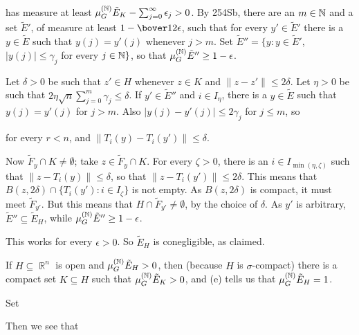 {

\noindent has measure at least
$\mu_G^{(\Bbb N)}\tilde E_K-\sum_{j=0}^{\infty}\epsilon_j>0$.   By
254Sb, there are an $m\in\Bbb N$ and a set $\tilde E'$, of measure at
least $1-\bover12\epsilon$, such that for every $y'\in\tilde E'$ there
is a $y\in\tilde E$ such that $y(j)=y'(j)$ whenever
$j>m$.   Set $\tilde E''
=\{y:y\in\tilde E'$, $|y(j)|\le\gamma_j$ for every $j\in\Bbb N\}$, so
that $\mu_G^{(\Bbb N)}\tilde E''\ge 1-\epsilon$.

Let $\delta>0$ be such that $z'\in H$ whenever $z\in K$ and
$\|z-z'\|\le 2\delta$.   Let $\eta>0$ be such that
$2\eta\sqrt{n}\sum_{j=0}^m\gamma_j\le\delta$.   If $y'\in\tilde E''$ and
$i\in I_{\eta}$, there is a $y\in\tilde E$ such that
$y(j)=y'(j)$ for $j>m$.   Also
$|y(j)-y'(j)|\le 2\gamma_j$ for $j\le m$, so


\noindent for every $r<n$, and $\|T_i(y)-T_i(y')\|\le\delta$.

Now $\tilde F_y\cap K\ne\emptyset$;  take $z\in\tilde F_y\cap K$.   For
every $\zeta>0$, there is an $i\in I_{\min(\eta,\zeta)}$ such that
$\|z-T_i(y)\|\le\delta$, so that $\|z-T_i(y')\|\le 2\delta$.
This means that $B(z,2\delta)\cap\{T_i(y'):i\in I_{\zeta}\}$ is not empty.
As $B(z,2\delta)$ is compact, it must meet $\tilde F_{y'}$.   But this
means that $H\cap\tilde F_{y'}\ne\emptyset$, by the choice of $\delta$.
As $y'$ is arbitrary, $\tilde E''\subseteq\tilde E_H$, while
$\mu_G^{(\Bbb N)}\tilde E''\ge 1-\epsilon$.

This works for every $\epsilon>0$.   So $\tilde E_H$ is conegligible, as
claimed.\ \Qed

\medskip

 If $H\subseteq\BbbR^n$ is open and
$\mu_G^{(\Bbb N)}\tilde E_H>0$, then (because $H$ is $\sigma$-compact)
there is a compact set $K\subseteq H$ such that
$\mu_G^{(\Bbb N)}\tilde E_K>0$, and (e) tells us that
$\mu_G^{(\Bbb N)}\tilde E_H=1$.

Set


\noindent Then we see that


}

